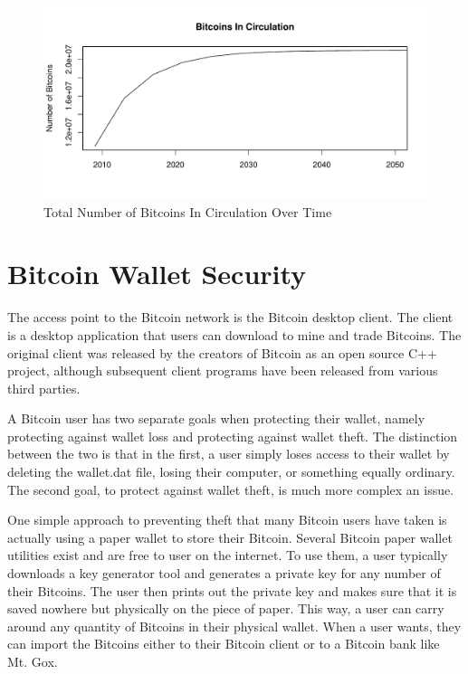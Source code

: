 \documentclass{report}
\begin{document}
\begin{figure}[h]
\begin{center}
\includegraphics[width=\textwidth]{images/quantity_v_time.pdf}
\caption{Total Number of Bitcoins In Circulation Over Time}
\label{fig:totalcoins}
\end{center}
\end{figure}

\section*{Bitcoin Wallet Security}
The access point to the Bitcoin network is the Bitcoin desktop client.  The client is a desktop
application that users can download to mine and trade Bitcoins.  The original client
was released by the creators of Bitcoin as an open source C++ project\cite{Andresen:source}, although
subsequent client programs have been released from various third parties.  

A Bitcoin user has two separate goals when protecting their wallet, namely protecting
against wallet loss and protecting against wallet theft.  The distinction between 
the two is that in the first, a user simply loses access to their wallet by deleting 
the wallet.dat file, losing their computer, or something equally ordinary.  The second 
goal, to protect against wallet theft, is much more complex an issue.

One simple approach to preventing theft that many Bitcoin users have taken is actually 
using a paper wallet to store their Bitcoin.  Several Bitcoin paper wallet utilities 
exist and are free to user on the internet.  To use them, a user typically downloads a 
key generator tool and generates a private key for any number of their Bitcoins.  The 
user then prints out the private key and makes sure that it is saved nowhere but 
physically on the piece of paper.  This way, a user can carry around any quantity of 
Bitcoins in their physical wallet.  When a user wants, they can import the Bitcoins 
either to their Bitcoin client or to a Bitcoin bank like Mt. Gox.
\end{document}
